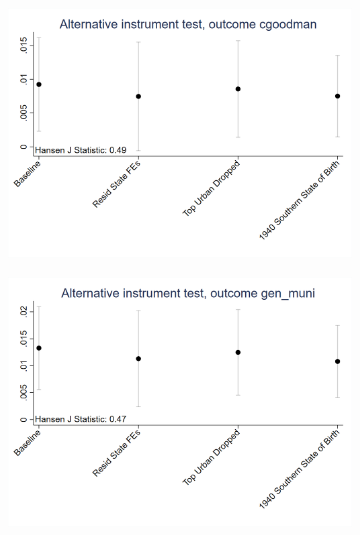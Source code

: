 \documentclass{article}
\begin{document}
\begin{figure}[htbp]
    \centering
    \begin{subfigure}{0.3\textwidth}
        \includegraphics[width=\linewidth]{exhibits/figures/exogeneity_tests/D16_alt_inst_pooled_cgoodman.png}
        \label{fig:sub1}
    \end{subfigure}
    \begin{subfigure}{0.3\textwidth}
        \includegraphics[width=\linewidth]{exhibits/figures/exogeneity_tests/D16_alt_inst_pooled_gen_muni.png}
        \label{fig:sub2}
    \end{subfigure}
    \begin{subfigure}{0.3\textwidth}

\end{subfigure}
\end{figure}
\end{document}
